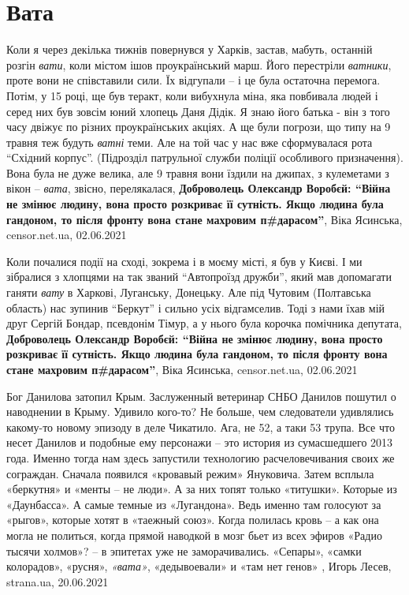  
 
 
 
 
\chapter{Вата}

Коли я через декілька тижнів повернувся у Харків, застав, мабуть, останній
розгін \emph{вати}, коли містом ішов проукраїнський марш. Його перестріли \emph{ватники},
проте вони не співставили сили. Їх відгупали – і це була остаточна перемога.
Потім, у 15 році, ще був теракт, коли вибухнула міна, яка повбивала людей і
серед них був зовсім юний хлопець Даня Дідік. Я знаю його батька - він з того
часу двіжує по різних проукраїнських акціях. А ще були погрози, що типу на 9
травня теж будуть \emph{ватні} теми. Але на той час у нас вже сформувалася рота
\enquote{Східний корпус}. (Підрозділ патрульної служби поліції особливого призначення).
Вона була не дуже велика, але 9 травня вони їздили на джипах, з кулеметами з
вікон – \emph{вата}, звісно, перелякалася, 
\textbf{Доброволець Олександр Воробєй: \enquote{Війна не змінює людину, вона
просто розкриває її сутність. Якщо людина була гандоном, то після фронту вона
стане махровим п\#дарасом}},
Віка Ясинська, censor.net.ua, 02.06.2021

Коли почалися події на сході, зокрема і в моєму місті, я був у Києві. І ми
зібралися з хлопцями на так званий \enquote{Автопроїзд дружби}, який мав допомагати
ганяти \emph{вату} в Харкові, Луганську, Донецьку. Але під Чутовим (Полтавська
область) нас зупинив \enquote{Беркут} і сильно усіх відгамселив. Тоді з нами їхав мій
друг Сергій Бондар, псевдонім Тімур, а у нього була корочка помічника депутата,
\textbf{Доброволець Олександр Воробєй: \enquote{Війна не змінює людину, вона
просто розкриває її сутність. Якщо людина була гандоном, то після фронту вона
стане махровим п\#дарасом}},
Віка Ясинська, censor.net.ua, 02.06.2021

Бог Данилова затопил Крым. Заслуженный ветеринар СНБО Данилов пошутил о
наводнении в Крыму. Удивило кого-то? Не больше, чем следователи удивлялись
какому-то новому эпизоду в деле Чикатило. Ага, не 52, а таки 53 трупа.  Все что
несет Данилов и подобные ему персонажи – это история из сумасшедшего 2013 года.
Именно тогда нам здесь запустили технологию расчеловечивания своих же
сограждан. Сначала появился «кровавый режим» Януковича. Затем всплыла
«беркутня» и «менты – не люди». А за них топят только «титушки». Которые из
«Даунбасса». А самые темные из «Лугандона». Ведь именно там голосуют за
«рыгов», которые хотят в «таежный союз».  Когда полилась кровь – а как она
могла не политься, когда прямой наводкой в мозг бьет из всех эфиров «Радио
тысячи холмов»? – в эпитетах уже не заморачивались. «Сепары», «самки
колорадов», «русня», \emph{«вата»}, «дедывоевали» и «там нет генов»
, 
Игорь Лесев, strana.ua, 20.06.2021

